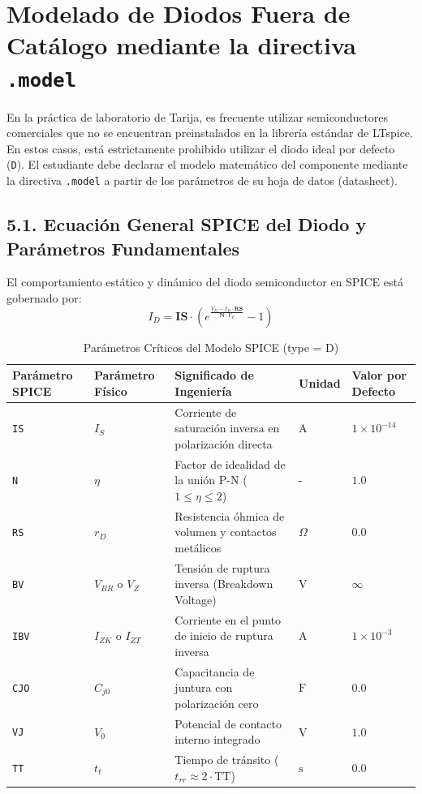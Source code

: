 \documentclass[11pt, a4paper]{article}
\begin{document}
\newpage
\section{Modelado de Diodos Fuera de Catálogo mediante la directiva \texttt{.model}}
En la práctica de laboratorio de Tarija, es frecuente utilizar semiconductores comerciales que no se encuentran preinstalados en la librería estándar de LTspice. En estos casos, está estrictamente prohibido utilizar el diodo ideal por defecto (\texttt{D}). El estudiante debe declarar el modelo matemático del componente mediante la directiva \texttt{.model} a partir de los parámetros de su hoja de datos (datasheet).

\subsection{5.1. Ecuación General SPICE del Diodo y Parámetros Fundamentales}
El comportamiento estático y dinámico del diodo semiconductor en SPICE está gobernado por:
\begin{equation*}
    I_D = \mathbf{IS} \cdot \left( e^{\frac{V_D - I_D \cdot \mathbf{RS}}{\mathbf{N} \cdot V_T}} - 1 \right)
\end{equation*}

\begin{table}[h!]
\centering
\caption{Parámetros Críticos del Modelo SPICE (type = D)}
\label{tab:spice_params}
\footnotesize
\renewcommand{\arraystretch}{1.3}
\begin{tabularx}{\textwidth}{@{} l l X l l @{}}
\toprule
\textbf{Parámetro SPICE} & \textbf{Parámetro Físico} & \textbf{Significado de Ingeniería} & \textbf{Unidad} & \textbf{Valor por Defecto} \\
\midrule
\texttt{IS} & $I_S$ & Corriente de saturación inversa en polarización directa & $\text{A}$ & $1\times 10^{-14}$ \\
\texttt{N} & $\eta$ & Factor de idealidad de la unión P-N ($1 \le \eta \le 2$) & - & $1.0$ \\
\texttt{RS} & $r_D$ & Resistencia óhmica de volumen y contactos metálicos & $\Omega$ & $0.0$ \\
\texttt{BV} & $V_{BR}$ o $V_Z$ & Tensión de ruptura inversa (Breakdown Voltage) & $\text{V}$ & $\infty$ \\
\texttt{IBV} & $I_{ZK}$ o $I_{ZT}$ & Corriente en el punto de inicio de ruptura inversa & $\text{A}$ & $1\times 10^{-3}$ \\
\texttt{CJO} & $C_{j0}$ & Capacitancia de juntura con polarización cero & $\text{F}$ & $0.0$ \\
\texttt{VJ} & $V_0$ & Potencial de contacto interno integrado & $\text{V}$ & $1.0$ \\
\texttt{TT} & $t_t$ & Tiempo de tránsito ($t_{rr} \approx 2 \cdot \text{TT}$) & $\text{s}$ & $0.0$ \\
\bottomrule
\end{tabularx}
\end{table}
\end{document}
